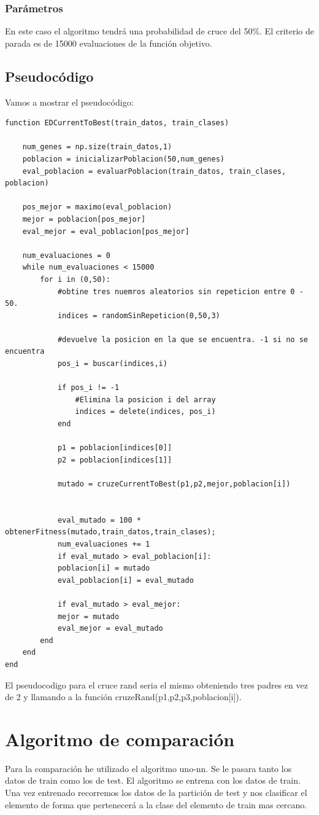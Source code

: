 \documentclass[titlepage]{article}
\begin{document}
	\subsubsection{Parámetros}
	En este caso el algoritmo tendrá una probabilidad de cruce del 50\%. El criterio de parada es de 15000 evaluaciones de la función objetivo. 
	
	\subsection{Pseudocódigo}
	Vamos a mostrar el pseudocódigo:
	\begin{lstlisting}
function EDCurrentToBest(train_datos, train_clases)
	
	num_genes = np.size(train_datos,1)
	poblacion = inicializarPoblacion(50,num_genes)
	eval_poblacion = evaluarPoblacion(train_datos, train_clases, poblacion)
	
	pos_mejor = maximo(eval_poblacion)
	mejor = poblacion[pos_mejor]
	eval_mejor = eval_poblacion[pos_mejor]
	
	num_evaluaciones = 0
	while num_evaluaciones < 15000
		for i in (0,50):
			#obtine tres nuemros aleatorios sin repeticion entre 0 - 50. 
			indices = randomSinRepeticion(0,50,3)
			
			#devuelve la posicion en la que se encuentra. -1 si no se encuentra
			pos_i = buscar(indices,i)
			
			if pos_i != -1
				#Elimina la posicion i del array
				indices = delete(indices, pos_i)
			end
			
			p1 = poblacion[indices[0]]
			p2 = poblacion[indices[1]]
			
			mutado = cruzeCurrentToBest(p1,p2,mejor,poblacion[i])
			
			
			eval_mutado = 100 * obtenerFitness(mutado,train_datos,train_clases);
			num_evaluaciones += 1
			if eval_mutado > eval_poblacion[i]:
			poblacion[i] = mutado
			eval_poblacion[i] = eval_mutado
			
			if eval_mutado > eval_mejor:
			mejor = mutado
			eval_mejor = eval_mutado
		end
	end
end
	\end{lstlisting}
	El pseudocodigo para el cruce rand seria el mismo obteniendo tres padres en vez de 2 y llamando a la función cruzeRand(p1,p2,p3,poblacion[i]).
	\section{Algoritmo de comparación}

	
	Para la comparación he utilizado el algoritmo uno-nn. Se le pasara tanto los datos de train como los de test. El algoritmo se entrena con los datos de train. Una vez entrenado recorremos los datos de la partición de test y nos clasificar el elemento de forma que pertenecerá a la clase del elemento de train mas cercano.
	
\end{document}
